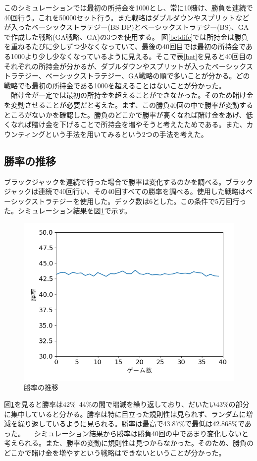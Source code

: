 このシミュレーションでは最初の所持金を1000とし、常に10賭け、勝負を連続で40回行う。これを50000セット行う。また戦略はダブルダウンやスプリットなどが入ったベーシックストラテジー(BS-DP)とベーシックストラテジー(BS)、GAで作成した戦略(GA戦略、GA)の3つを使用する。
 図\ref{betdife}では所持金は勝負を重ねるたびに少しずつ少なくなっていて、最後の40回目では最初の所持金である1000より少し少なくなっているように見える。そこで表\ref{bet}を見ると40回目のそれぞれの所持金が分かるが、ダブルダウンやスプリットが入ったベーシックストラテジー、ベーシックストラテジー、GA戦略の順で多いことが分かる。どの戦略でも最初の所持金である1000を超えることはないことが分かった。\\
　賭け金が一定では最初の所持金を超えることができなかった。そのため賭け金を変動させることが必要だと考えた。まず、この勝負40回の中で勝率が変動するところがないかを確認した。勝負のどこかで勝率が高くなれば賭け金をあげ、低くなれば賭け金を下げることで所持金を増やそうと考えたためである。また、カウンティングという手法を用いてみるという2つの手法を考えた。

\subsection{勝率の推移}
ブラックジャックを連続で行った場合で勝率は変化するのかを調べる。ブラックジャックは連続で40回行い、その40回すべての勝率を調べる。使用した戦略はベーシックストラテジーを使用した。デック数は6とした。この条件で5万回行った。シミュレーション結果を図\ref{win}で示す。
\begin{figure}[H]
 \begin{center} 
  \includegraphics[width=0.7\linewidth]{./figure/win}
  \caption{勝率の推移\label{win}}
 \end{center}
\end{figure}
図\ref{win}を見ると勝率は42\%~44\%の間で増減を繰り返しており、だいたい43\%の部分に集中していると分かる。勝率は特に目立った規則性は見られず、ランダムに増減を繰り返しているように見られる。勝率は最高で43.87\%で最低は42.868\%であった。
　シミュレーション結果から勝率は勝負40回の中であまり変化しないと考えられる。また、勝率の変動に規則性は見つからなかった。そのため、勝負のどこかで賭け金を増やすという戦略はできないということが分かった。

